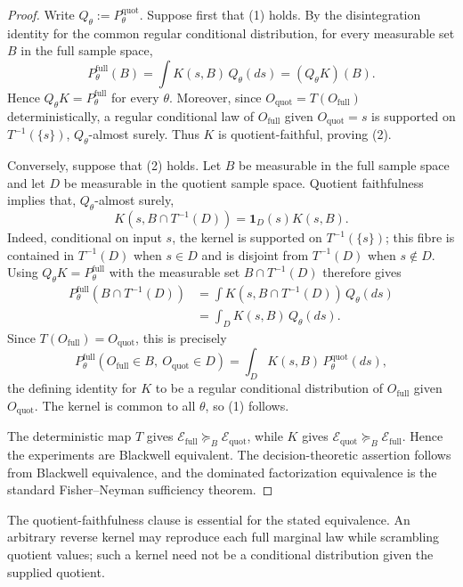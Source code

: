 \documentclass[11pt]{article}
\theoremstyle{plain}
\theoremstyle{definition}
\numberwithin{equation}{section}
\newcommand{\1}{\mathbf 1}
\newcommand{\calE}{\mathcal E}
\newcommand{\full}{\mathrm{full}}
\newcommand{\quot}{\mathrm{quot}}
\begin{document}
\begin{proof}
	Write \(Q_\theta:=P_\theta^{\quot}\). Suppose first that (1) holds. By the
	disintegration identity for the common regular conditional distribution, for
	every measurable set \(B\) in the full sample space,
	\[
	P_\theta^{\full}(B)
	=
	\int K(s,B)\,Q_\theta(ds)
	=
	(Q_\theta K)(B).
	\]
	Hence \(Q_\theta K=P_\theta^{\full}\) for every \(\theta\). Moreover, since
	\(O_{\quot}=T(O_{\full})\) deterministically, a regular conditional law of
	\(O_{\full}\) given \(O_{\quot}=s\) is supported on
	\(T^{-1}(\{s\})\), \(Q_\theta\)-almost surely. Thus \(K\) is
	quotient-faithful, proving (2).
	
	Conversely, suppose that (2) holds. Let \(B\) be measurable in the full sample
	space and let \(D\) be measurable in the quotient sample space. Quotient
	faithfulness implies that, \(Q_\theta\)-almost surely,
	\[
	K\!\left(s,B\cap T^{-1}(D)\right)
	=
	\mathbf 1_D(s)K(s,B).
	\]
	Indeed, conditional on input \(s\), the kernel is supported on
	\(T^{-1}(\{s\})\); this fibre is contained in \(T^{-1}(D)\) when \(s\in D\)
	and is disjoint from \(T^{-1}(D)\) when \(s\notin D\). Using
	\(Q_\theta K=P_\theta^{\full}\) with the measurable set
	\(B\cap T^{-1}(D)\) therefore gives
	\[
	\begin{aligned}
		P_\theta^{\full}\!\left(B\cap T^{-1}(D)\right)
		&=
		\int K\!\left(s,B\cap T^{-1}(D)\right)\,Q_\theta(ds)\\
		&=
		\int_D K(s,B)\,Q_\theta(ds).
	\end{aligned}
	\]
	Since \(T(O_{\full})=O_{\quot}\), this is precisely
	\[
	P_\theta^{\full}\!\left(O_{\full}\in B,\ O_{\quot}\in D\right)
	=
	\int_D K(s,B)\,P_\theta^{\quot}(ds),
	\]
	the defining identity for \(K\) to be a regular conditional distribution of
	\(O_{\full}\) given \(O_{\quot}\). The kernel is common to all
	\(\theta\), so (1) follows.
	
	The deterministic map \(T\) gives
	\(\calE_{\full}\succeq_B\calE_{\quot}\), while \(K\) gives
	\(\calE_{\quot}\succeq_B\calE_{\full}\). Hence the experiments are Blackwell
	equivalent. The decision-theoretic assertion follows from Blackwell
	equivalence, and the dominated factorization equivalence is the standard
	Fisher--Neyman sufficiency theorem.
\end{proof}

The quotient-faithfulness clause is essential for the stated equivalence. An arbitrary reverse kernel may reproduce each full marginal law while scrambling quotient values; such a kernel need not be a conditional distribution given the supplied quotient.
\end{document}
